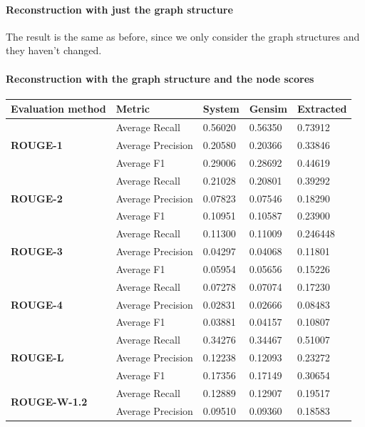 \paragraph{Reconstruction with just the graph structure}

The result is the same as before, since we only consider the graph structures and they haven't changed.

\paragraph{Reconstruction with the graph structure and the node scores}

\begin{longtable}{| l | l | l | l | l |}
	\hline
	\textbf{Evaluation method}&\textbf{Metric}&\textbf{System}&\textbf{Gensim}&\textbf{Extracted}\\ \hline \hline
	\multirow{3}{*}{\textbf{ROUGE-1}}
	&Average Recall&0.56020&0.56350&0.73912 \\
	&Average Precision&0.20580&0.20366&0.33846 \\ 
	&Average F1&0.29006&0.28692&0.44619 \\ \hline \hline
	\multirow{3}{*}{\textbf{ROUGE-2}}
	&Average Recall&0.21028&0.20801&0.39292 \\
	&Average Precision&0.07823&0.07546&0.18290 \\
	&Average F1&0.10951&0.10587&0.23900 \\ \hline \hline
	\multirow{3}{*}{\textbf{ROUGE-3}}
	&Average Recall&0.11300&0.11009&0.246448 \\
	&Average Precision&0.04297&0.04068&0.11801 \\
	&Average F1&0.05954&0.05656&0.15226 \\ \hline \hline
	\multirow{3}{*}{\textbf{ROUGE-4}}
	&Average Recall&0.07278&0.07074&0.17230 \\
	&Average Precision&0.02831&0.02666&0.08483 \\
	&Average F1&0.03881&0.04157&0.10807 \\ \hline \hline
	\multirow{3}{*}{\textbf{ROUGE-L}}
	&Average Recall&0.34276&0.34467&0.51007 \\
	&Average Precision&0.12238&0.12093&0.23272 \\
	&Average F1&0.17356&0.17149&0.30654 \\ \hline \hline
	\multirow{3}{*}{\textbf{ROUGE-W-1.2}}
	&Average Recall&0.12889&0.12907&0.19517 \\
	&Average Precision&0.09510&0.09360&0.18583 \\

\end{longtable}
